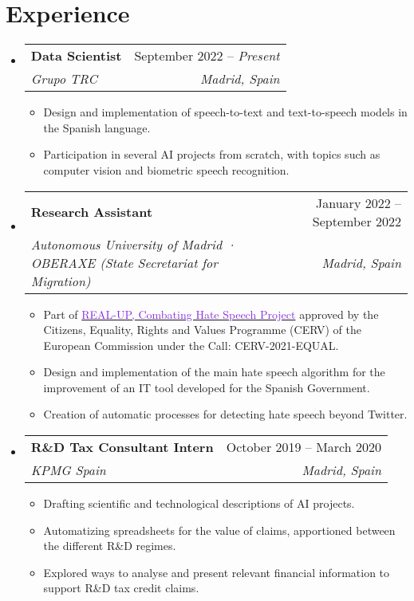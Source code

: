 \documentclass[letterpaper,11pt]{article}
\makeatletter
\newcommand{\resumeItem}[1]{
  \item\small{
    {#1 \vspace{-2pt}}
  }
}
\newcommand{\resumeSubheading}[4]{
  \vspace{-2pt}\item
    \begin{tabular*}{0.97\textwidth}[t]{l@{\extracolsep{\fill}}r}
      \textbf{#1} & #2 \\
      \textit{\small#3} & \textit{\small #4} \\
    \end{tabular*}\vspace{-7pt}
}
\newcommand{\resumeSubSubheading}[2]{
    \item
    \begin{tabular*}{0.97\textwidth}{l@{\extracolsep{\fill}}r}
      \textit{\small#1} & \textit{\small #2} \\
    \end{tabular*}\vspace{-7pt}
}
\newcommand{\resumeSubHeadingListStart}{\begin{itemize}[leftmargin=0.15in, label={}]}
\newcommand{\resumeSubHeadingListEnd}{\end{itemize}}
\newcommand{\resumeItemListStart}{\begin{itemize}}
\newcommand{\resumeItemListEnd}{\end{itemize}\vspace{-5pt}}
\makeatother
\begin{document}
\section{Experience}
  \resumeSubHeadingListStart
      \resumeSubheading
      {Data Scientist}{ September 2022 -- \textit{Present}}
      {Grupo TRC}{Madrid, Spain}
      \resumeItemListStart
        \resumeItem{Design and implementation of speech-to-text and text-to-speech models in the Spanish language.}
        \resumeItem{Participation in several AI projects from scratch, with topics such as computer vision and biometric speech recognition.}
      \resumeItemListEnd

      \resumeSubheading
      {Research Assistant}{ January 2022 -- September 2022}
      {Autonomous University of Madrid · OBERAXE (State Secretariat for Migration)}{Madrid, Spain}
      \resumeItemListStart
        \resumeItem{Part of \href{https://real-up.eu/summary-in-english/}{\textcolor{BlueViolet}{REAL-UP, Combating Hate Speech Project}} approved by the Citizens, Equality, Rights and Values Programme (CERV) of the European Commission under the Call: CERV-2021-EQUAL.}
        \resumeItem{Design and implementation of the main hate speech algorithm for the improvement of an IT tool developed for the Spanish Government.}
        \resumeItem{Creation of automatic processes for detecting hate speech beyond Twitter.}
      \resumeItemListEnd

      \resumeSubheading
      {R\&D Tax Consultant Intern}{October 2019 -- March 2020}
      {KPMG Spain}{Madrid, Spain}
      \resumeItemListStart
        \resumeItem{Drafting scientific and technological descriptions of AI projects.}
        \resumeItem{Automatizing spreadsheets for the value of claims, apportioned between the different R\&D regimes.}
        \resumeItem{Explored ways to analyse and present relevant financial information to support R\&D tax credit claims.}
      \resumeItemListEnd
      

  \resumeSubHeadingListEnd


\end{document}
